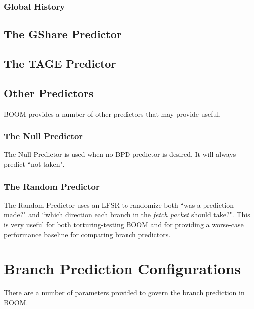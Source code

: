 
\subsubsection{Global History}


\subsection{The GShare Predictor}


\subsection{The TAGE Predictor}


\subsection{Other Predictors}

BOOM provides a number of other predictors that may provide useful.

\subsubsection{The Null Predictor}

The Null Predictor is used when no BPD predictor is desired. It will always predict ``not taken".

\subsubsection{The Random Predictor}

The Random Predictor uses an LFSR to randomize both ``was a prediction made?" and ``which direction each branch in the {\em fetch packet} should take?".  This is very useful for both torturing-testing BOOM and for providing a worse-case performance baseline for comparing branch predictors.

\section{Branch Prediction Configurations}

There are a number of parameters provided to govern the branch prediction in BOOM.

 
